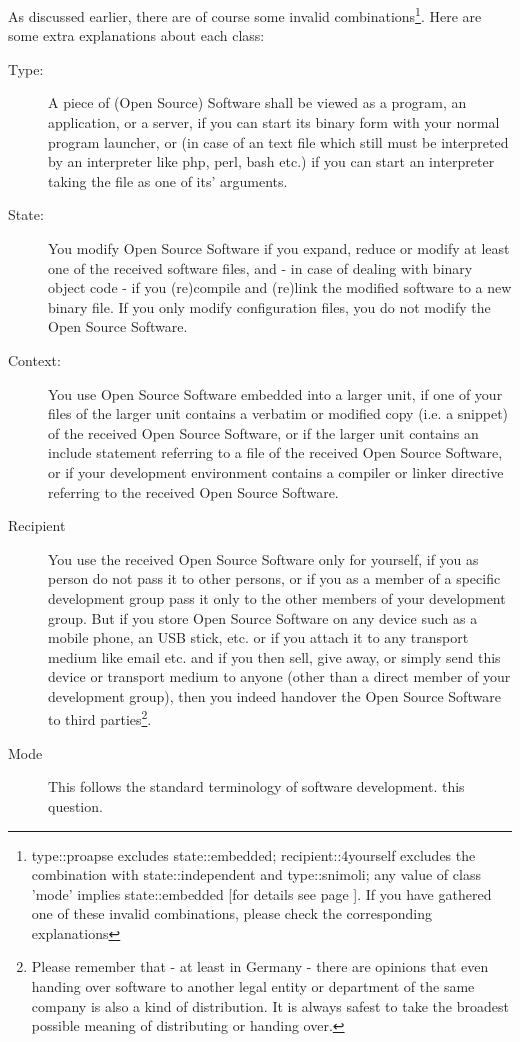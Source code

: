 As discussed earlier, there are of course some invalid
combinations\footnote{type::proapse excludes state::embedded;
recipient::4yourself excludes the combination with state::independent and
type::snimoli; any value of class 'mode' implies state::embedded [for details
see page \pageref{InvalidFinderTokenCombinations}]. If you have gathered one of
these invalid combinations, please check the corresponding explanations}. Here
are some extra explanations about each class:

\begin{description}
\item[Type:] A piece of (Open Source) Software shall be viewed as a program, an
application, or a server, if you can start its binary form with your normal
program launcher, or (in case of an text file which still must be interpreted by
an interpreter like php, perl, bash etc.) if you can start an interpreter taking
the file as one of its' arguments. \item[State:] You modify Open Source Software
if you expand, reduce or modify at least one of the received software files, and
- in case of dealing with binary object code - if you (re)compile and (re)link
the modified software to a new binary file. If you only modify configuration
files, you do not modify the Open Source Software.
\item[Context:] You use Open Source Software embedded into a larger unit, if one
of your files of the larger unit contains a verbatim or modified copy (i.e. a
snippet) of the received Open Source Software, or if the larger unit contains an
include statement referring to a file of the received Open Source Software, or
if your development environment contains a compiler or linker directive
referring to the received Open Source Software.
\item[Recipient] You use the received Open Source Software only for yourself, if
you as person do not pass it to other persons, or if you as a member of a
specific development group pass it only to the other members of your
development group. But if you store Open Source Software on any device such as a
mobile phone, an USB stick, etc. or if you attach it to any transport
medium like email etc. and if you then sell, give away, or simply send this
device or transport medium to anyone (other than a direct member
of your development group), then you indeed handover the Open Source Software to
third parties\footnote{Please remember that - at least in Germany - there are
opinions that even handing over software to another legal entity or department
of the same company is also a kind of distribution. It is always safest
to take the broadest possible meaning of distributing or handing over.}.
\item[Mode] This follows the standard terminology of software development.
this question.
\end{description}

